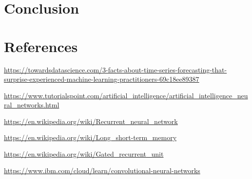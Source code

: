 \documentclass{article}
\begin{document}
\section{Conclusion}



\section{References}

\url{https://towardsdatascience.com/3-facts-about-time-series-forecasting-that-surprise-experienced-machine-learning-practitioners-69c18ee89387}

\url{https://www.tutorialspoint.com/artificial_intelligence/artificial_intelligence_neural_networks.html}

\url{https://en.wikipedia.org/wiki/Recurrent_neural_network}

\url{https://en.wikipedia.org/wiki/Long_short-term_memory}

\url{https://en.wikipedia.org/wiki/Gated_recurrent_unit}

\url{https://www.ibm.com/cloud/learn/convolutional-neural-networks}
\end{document}
